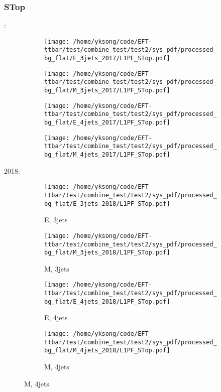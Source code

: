 \documentclass{beamer}
\begin{document}
\begin{frame}
\frametitle{STop}
\fontsize{5}{1}:
\begin{figure}
\centering
\begin{subfigure}[b]{0.24\textwidth}
\texttt{[image: /home/yksong/code/EFT-ttbar/test/combine\_test/test2/sys\_pdf/processed\_bg\_flat/E\_3jets\_2017/L1PF\_STop.pdf]}
\end{subfigure}
\begin{subfigure}[b]{0.24\textwidth}
\texttt{[image: /home/yksong/code/EFT-ttbar/test/combine\_test/test2/sys\_pdf/processed\_bg\_flat/M\_3jets\_2017/L1PF\_STop.pdf]}
\end{subfigure}
\begin{subfigure}[b]{0.24\textwidth}
\texttt{[image: /home/yksong/code/EFT-ttbar/test/combine\_test/test2/sys\_pdf/processed\_bg\_flat/E\_4jets\_2017/L1PF\_STop.pdf]}
\end{subfigure}
\begin{subfigure}[b]{0.24\textwidth}
\texttt{[image: /home/yksong/code/EFT-ttbar/test/combine\_test/test2/sys\_pdf/processed\_bg\_flat/M\_4jets\_2017/L1PF\_STop.pdf]}
\end{subfigure}
\end{figure}
2018:
\begin{figure}
\centering
\begin{subfigure}[b]{0.24\textwidth}
\texttt{[image: /home/yksong/code/EFT-ttbar/test/combine\_test/test2/sys\_pdf/processed\_bg\_flat/E\_3jets\_2018/L1PF\_STop.pdf]}
\captionsetup{font=tiny}
\caption{E, 3jets}
\end{subfigure}
\begin{subfigure}[b]{0.24\textwidth}
\texttt{[image: /home/yksong/code/EFT-ttbar/test/combine\_test/test2/sys\_pdf/processed\_bg\_flat/M\_3jets\_2018/L1PF\_STop.pdf]}
\captionsetup{font=tiny}
\caption{M, 3jets}
\end{subfigure}
\begin{subfigure}[b]{0.24\textwidth}
\texttt{[image: /home/yksong/code/EFT-ttbar/test/combine\_test/test2/sys\_pdf/processed\_bg\_flat/E\_4jets\_2018/L1PF\_STop.pdf]}
\captionsetup{font=tiny}
\caption{E, 4jets}
\end{subfigure}
\begin{subfigure}[b]{0.24\textwidth}
\texttt{[image: /home/yksong/code/EFT-ttbar/test/combine\_test/test2/sys\_pdf/processed\_bg\_flat/M\_4jets\_2018/L1PF\_STop.pdf]}
\captionsetup{font=tiny}
\caption{M, 4jets}
\end{subfigure}
\end{figure}
\end{frame}
\end{document}

